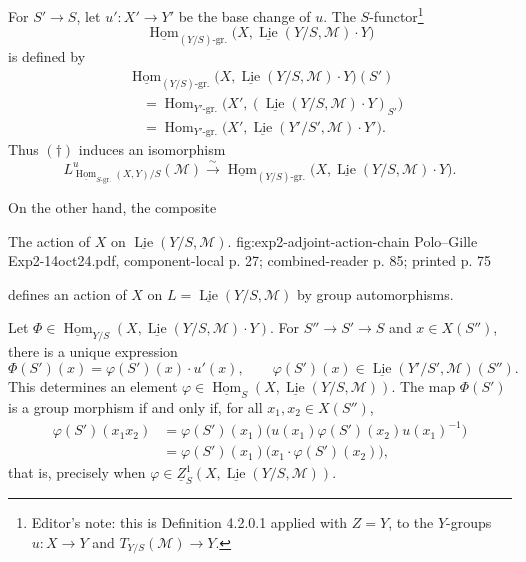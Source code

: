 For \(S'\to S\), let \(u':X'\to Y'\) be the base change of \(u\). The
\(S\)-functor\footnote{Editor's note: this is Definition 4.2.0.1 applied
with \(Z=Y\), to the \(Y\)-groups \(u:X\to Y\) and
\(T_{Y/S}(\mathcal M)\to Y\).}
\[
 \underline{\operatorname{Hom}}_{(Y/S)\text{-gr.}}
   \bigl(X,\underline{\operatorname{Lie}}(Y/S,\mathcal M)\cdot Y\bigr)
\]
is defined by
\[
\begin{aligned}
 &\underline{\operatorname{Hom}}_{(Y/S)\text{-gr.}}
 \bigl(X,\underline{\operatorname{Lie}}(Y/S,\mathcal M)\cdot Y\bigr)(S')\\
 &\quad=
 \operatorname{Hom}_{Y'\text{-gr.}}
 \bigl(X',(\underline{\operatorname{Lie}}(Y/S,\mathcal M)\cdot Y)_{S'}\bigr)\\
 &\quad=
 \operatorname{Hom}_{Y'\text{-gr.}}
 \bigl(X',\underline{\operatorname{Lie}}(Y'/S',\mathcal M)\cdot Y'\bigr).
\end{aligned}
\]
Thus \((\dagger)\) induces an isomorphism
\begin{equation}
 L^u_{\underline{\operatorname{Hom}}_{S\text{-gr.}}(X,Y)/S}
   (\mathcal M)
 \xrightarrow{\sim}
 \underline{\operatorname{Hom}}_{(Y/S)\text{-gr.}}
 \bigl(X,\underline{\operatorname{Lie}}(Y/S,\mathcal M)\cdot Y\bigr).
 \tag{\(\dagger'\)}
\end{equation}

On the other hand, the composite

  {The action of \(X\) on
  \(\underline{\operatorname{Lie}}(Y/S,\mathcal M)\).}
  {fig:exp2-adjoint-action-chain}
  {Polo--Gille Exp2-14oct24.pdf, component-local p. 27; combined-reader p. 85; printed p. 75}

defines an action of \(X\) on
\(L=\underline{\operatorname{Lie}}(Y/S,\mathcal M)\) by group
automorphisms.

Let
\(\Phi\in\underline{\operatorname{Hom}}_{Y/S}
(X,\underline{\operatorname{Lie}}(Y/S,\mathcal M)\cdot Y)\). For
\(S''\to S'\to S\) and \(x\in X(S'')\), there is a unique expression
\[
 \Phi(S')(x)=\varphi(S')(x)\cdot u'(x),
 \qquad
 \varphi(S')(x)\in
 \underline{\operatorname{Lie}}(Y'/S',\mathcal M)(S'').
\]
This determines an element
\(\varphi\in\underline{\operatorname{Hom}}_S
(X,\underline{\operatorname{Lie}}(Y/S,\mathcal M))\). The map
\(\Phi(S')\) is a group morphism if and only if, for all
\(x_1,x_2\in X(S'')\),
\[
\begin{aligned}
 \varphi(S')(x_1x_2)
 &=\varphi(S')(x_1)
   \bigl(u(x_1)\varphi(S')(x_2)u(x_1)^{-1}\bigr)\\
 &=\varphi(S')(x_1)
   \bigl(x_1\cdot\varphi(S')(x_2)\bigr),
\end{aligned}
\]
that is, precisely when
\(\varphi\in\underline Z^1_S
(X,\underline{\operatorname{Lie}}(Y/S,\mathcal M))\).

